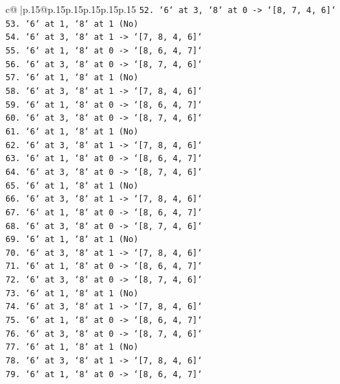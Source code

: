 \documentclass{article}
\begin{document}
{\begin{supertabular}{c@{$\;$}|p{.15\linewidth}@{}p{.15\linewidth}p{.15\linewidth}p{.15\linewidth}p{.15\linewidth}p{.15\linewidth}}
{{{\texttt{52. `6` at 3, `8` at 0 {-}> `{[}8, 7, 4, 6{]}`} \\
\texttt{53. `6` at 1, `8` at 1 (No)} \\
\texttt{54. `6` at 3, `8` at 1 {-}> `{[}7, 8, 4, 6{]}`} \\
\texttt{55. `6` at 1, `8` at 0 {-}> `{[}8, 6, 4, 7{]}`} \\
\texttt{56. `6` at 3, `8` at 0 {-}> `{[}8, 7, 4, 6{]}`} \\
\texttt{57. `6` at 1, `8` at 1 (No)} \\
\texttt{58. `6` at 3, `8` at 1 {-}> `{[}7, 8, 4, 6{]}`} \\
\texttt{59. `6` at 1, `8` at 0 {-}> `{[}8, 6, 4, 7{]}`} \\
\texttt{60. `6` at 3, `8` at 0 {-}> `{[}8, 7, 4, 6{]}`} \\
\texttt{61. `6` at 1, `8` at 1 (No)} \\
\texttt{62. `6` at 3, `8` at 1 {-}> `{[}7, 8, 4, 6{]}`} \\
\texttt{63. `6` at 1, `8` at 0 {-}> `{[}8, 6, 4, 7{]}`} \\
\texttt{64. `6` at 3, `8` at 0 {-}> `{[}8, 7, 4, 6{]}`} \\
\texttt{65. `6` at 1, `8` at 1 (No)} \\
\texttt{66. `6` at 3, `8` at 1 {-}> `{[}7, 8, 4, 6{]}`} \\
\texttt{67. `6` at 1, `8` at 0 {-}> `{[}8, 6, 4, 7{]}`} \\
\texttt{68. `6` at 3, `8` at 0 {-}> `{[}8, 7, 4, 6{]}`} \\
\texttt{69. `6` at 1, `8` at 1 (No)} \\
\texttt{70. `6` at 3, `8` at 1 {-}> `{[}7, 8, 4, 6{]}`} \\
\texttt{71. `6` at 1, `8` at 0 {-}> `{[}8, 6, 4, 7{]}`} \\
\texttt{72. `6` at 3, `8` at 0 {-}> `{[}8, 7, 4, 6{]}`} \\
\texttt{73. `6` at 1, `8` at 1 (No)} \\
\texttt{74. `6` at 3, `8` at 1 {-}> `{[}7, 8, 4, 6{]}`} \\
\texttt{75. `6` at 1, `8` at 0 {-}> `{[}8, 6, 4, 7{]}`} \\
\texttt{76. `6` at 3, `8` at 0 {-}> `{[}8, 7, 4, 6{]}`} \\
\texttt{77. `6` at 1, `8` at 1 (No)} \\
\texttt{78. `6` at 3, `8` at 1 {-}> `{[}7, 8, 4, 6{]}`} \\
\texttt{79. `6` at 1, `8` at 0 {-}> `{[}8, 6, 4, 7{]}`} \\
}}}
\end{supertabular}}
\end{document}
